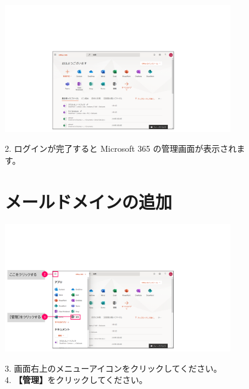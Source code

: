 \begin{figure}[h]
    \begin{minipage}{0.6\textwidth}
        \vspace{-1.5cm}
        \includegraphics[width=10cm]{figures/M365_setting1-01.png}
    \end{minipage}
    \begin{minipage}{0.4\textwidth}
        2. ログインが完了すると Microsoft 365 の管理画面が表示されます。
    \end{minipage}
\end{figure}

\begin{figure}[h]
    \begin{minipage}{1.0\textwidth}
        \section{メールドメインの追加}
        \label{sec:メールドメインの追加}
    \end{minipage}
\end{figure}

\begin{figure}[h]
    \begin{minipage}{0.6\textwidth}
        \vspace{-1.5cm}
        \includegraphics[width=10cm]{figures/M365_setting1-02.png}
    \end{minipage}
    \begin{minipage}{0.4\textwidth}
        3. 画面右上のメニューアイコンをクリックしてください。\\
        4. \textbf{【管理】}をクリックしてください。
    \end{minipage}
\end{figure}

